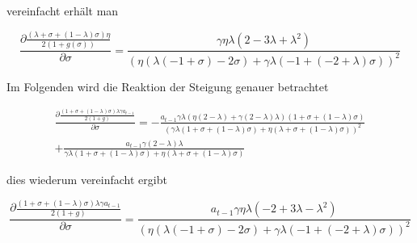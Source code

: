 vereinfacht erhält man


\begin{equation}
\frac{\partial\frac{(\lambda + \sigma + (1- \lambda) \sigma) \eta}{2(1+ g(\sigma))}}{\partial\sigma}=\frac{\gamma \eta \lambda(2 -3\lambda +\lambda^{2})}{(\eta(\lambda(-1 + \sigma)-2 \sigma) + \gamma \lambda (-1 + (-2 + \lambda) \sigma))^{2}}
\end{equation}


Im Folgenden wird die Reaktion der Steigung genauer betrachtet 


\begin{equation}
\begin{split} 
\frac{\partial\frac{(1+\sigma+(1-\lambda)\sigma)\lambda\gamma a_{t-1}}{2(1+g)}}{\partial\sigma} =- \frac{a_{t-1} \gamma \lambda ( \eta (2- \lambda)+\gamma(2-\lambda) \lambda)(1+ \sigma + (1- \lambda) \sigma)}{(\gamma \lambda (1+ \sigma + (1- \lambda) \sigma) + \eta (\lambda + \sigma +(1- \lambda) \sigma))^{2}}\\
+ \frac{a_{t-1} \gamma (2- \lambda) \lambda}{ \gamma \lambda (1+ \sigma + (1- \lambda) \sigma) + \eta (\lambda + \sigma +(1- \lambda) \sigma)}
\end{split}
\end{equation}


dies wiederum vereinfacht ergibt


\begin{equation}
\frac{\partial\frac{(1+\sigma+(1-\lambda)\sigma)\lambda\gamma a_{t-1}}{2(1+g)}}{\partial\sigma} =\frac{a_{t-1}\gamma \eta \lambda (-2 +3 \lambda -\lambda^{2})}{(\eta (\lambda (-1 + \sigma) -2 \sigma) + \gamma \lambda (-1+(-2 + \lambda) \sigma))^{2}}
\end{equation}